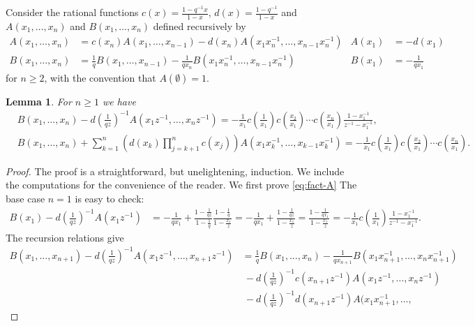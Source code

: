 \documentclass{amsart}
\newtheorem{lemma}[thm]{Lemma}
\theoremstyle{definition}
\begin{document}
{Consider the rational functions $c(x) = \frac{1-q^{-1}x}{1-x}$,
$d(x)=\frac{1-q^{-1}}{1-x}$ and $A(x_1,\ldots, x_n)$ and
$B(x_1,\ldots,x_n)$ defined recursively by
\begin{align*} 
A(x_1,\ldots, x_n)&=c(x_n)A(x_1,\ldots,x_{n-1})-d(x_n)A(x_1x_n^{-1},\ldots,x_{n-1}x_n^{-1})&A(x_1)&=-d(x_1)\\
B(x_1,\ldots, x_n)&=\frac{1}{q}B(x_1,\ldots, x_{n-1})-\frac{1}{qx_n}B(x_1x_n^{-1},\ldots,x_{n-1}x_n^{-1})&B(x_1)&=-\frac{1}{qx_1}
\end{align*}
for $n\geq 2$, with the convention that $A(\emptyset)=1$.
\begin{lemma}\label{l:fact-AB}
For $n\geq 1$ we have
\begin{align} \label{eq:fact-A}
&B(x_1,\ldots,x_n)-d
\left(\frac{1}{qz}\right)^{-1}A(x_1z^{-1},\ldots,
x_nz^{-1})=-\frac{1}{x_1}c \left(\frac{1}{x_1}\right)c
\left(\frac{x_2}{x_1}\right)\cdots c
\left(\frac{x_n}{x_1}\right)\frac{1-x_1^{-1}}{z^{-1}-x_1^{-1}}, \\ \label{eq:fact-B}
&B(x_1,\ldots, x_n)+\sum_{k=1}^{n}\left(d(x_k)\prod_{j=k+1}^nc(x_j)\right)A(x_1x_k^{-1},\ldots, x_{k-1}x_k^{-1}) =-\frac{1}{x_1}c \left(\frac{1}{x_1}\right)c
\left(\frac{x_2}{x_1}\right)\cdots c
\left(\frac{x_n}{x_1}\right).
\end{align}
\end{lemma}
\begin{proof}
The proof is a straightforward, but unelightening, induction. We
include the computations for the convenience of the reader. We first prove  \eqref{eq:fact-A} The base case $n=1$ is easy to check:
\begin{align*}
B(x_1)-d
  \left(\frac{1}{qz}\right)^{-1}A(x_1z^{-1})&=-\frac{1}{qx_1}+\frac{1-\frac{1}{qz}}{1-\frac{1}{q}}\frac{1-\frac{1}{q}}{1-\frac{x_1}{z}}=-\frac{1}{qx_1}+\frac{1-\frac{1}{qz}}{1-\frac{x_1}{z}}=\frac{1-\frac{1}{qx_1}}{1-\frac{x_1}{z}}=-\frac{1}{x_1}c \left(\frac{1}{x_1}\right)\frac{1-x_1^{-1}}{z^{-1}-x_1^{-1}}.
\end{align*}
The recursion relations give
\begin{align*}
B(x_1,\ldots,x_{n+1})-d
\left(\frac{1}{qz}\right)^{-1}A(x_1z^{-1},\ldots,
x_{n+1}z^{-1})&=\frac{1}{q}B(x_1,\ldots,x_{n})-\frac{1}{qx_{n+1}}B(x_1x_{n+1}^{-1},\ldots,
                x_nx_{n+1}^{-1})\\
  &\ -d
    \left(\frac{1}{qz}\right)^{-1}c(x_{n+1}z^{-1})A(x_1z^{-1},\ldots,x_nz^{-1})\\
  &\ -d
\left(\frac{1}{qz}\right)^{-1}d(x_{n+1}z^{-1})A(x_1x_{n+1}^{-1},\ldots,

\end{align*}
\end{proof}}
\end{document}
